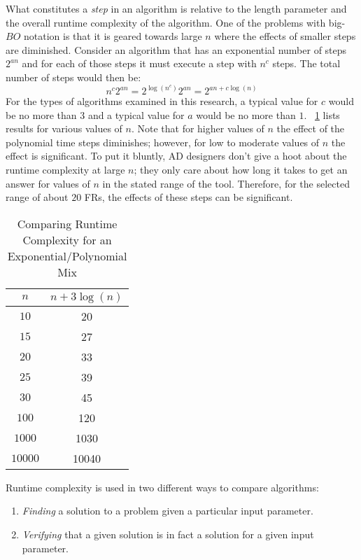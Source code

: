 What constitutes a \emph{step} in an algorithm is relative to the length parameter and the overall runtime
complexity of the algorithm.  One of the problems with big-\(BO\) notation is that it is geared towards large \(n\)
where the effects of smaller steps are diminished.  Consider an algorithm that has an exponential number of steps
\(2^{an}\) and for each of those steps it must execute a step with \(n^c\) steps.  The total number of steps would
then be:
\[n^c2^{an}=2^{\log(n^c)}2^{an}=2^{an+c\log(n)}\]
For the types of algorithms examined in this research, a typical value for \(c\) would be no more than \(3\) and a
typical value for \(a\) would be no more than \(1\).  \tablename~\ref{tab:grow} lists results for various values of
\(n\).  Note that for higher values of \(n\) the effect of the polynomial time steps diminishes; however, for low
to moderate values of \(n\) the effect is significant.  To put it bluntly, AD designers don't give a hoot about the
runtime complexity at large \(n\); they only care about how long it takes to get an answer for values of \(n\) in
the stated range of the tool.  Therefore, for the selected range of about \(20\) FRs, the effects of these steps
can be significant.

\begin{table}[H]
  \setlength{\extrarowheight}{2ex}
  \centering
  \caption{Comparing Runtime Complexity for an Exponential/Polynomial Mix}
  \label{tab:grow}
  \begin{tabular}{|c|c|}
    \hline
    \(n\) & \(n+3\log(n)\) \\
    \hline
    \(10\) & 20 \\
    \hline
    \(15\) & 27 \\
    \hline
    \(20\) & 33 \\
    \hline
    \(25\) & 39 \\
    \hline
    \(30\) & 45 \\
    \hline
    \(100\) & 120 \\
    \hline
    \(1000\) & 1030 \\
    \hline
    \(10000\) & 10040 \\
    \hline
  \end{tabular}
\end{table}

Runtime complexity is used in two different ways to compare algorithms:
\begin{enumerate}
\item \emph{Finding} a solution to a problem given a particular input parameter.
\item \emph{Verifying} that a given solution is in fact a solution for a given input parameter.
\end{enumerate}

